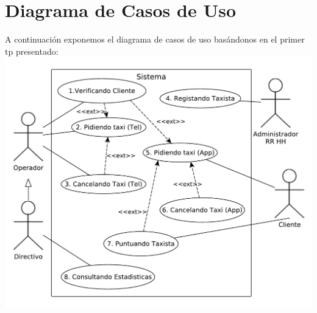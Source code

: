 \documentclass[a4paper]{article}
\begin{document}
\newtheorem{teo}{Teorema}[section]
\newtheorem{propo}{Proposici\'{o}n}[section]
\newtheorem{lema}{Lema}[section]
\newtheorem{coro}{Corolario}[section]
\newtheorem{defi}{Definici\'{o}n}[section]

\newpage
\thispagestyle{empty}
\tableofcontents

\parskip=5pt
\setlength{\parindent}{0pt}

\newpage
\setcounter{page}{1}
\pagestyle{plain}

\newpage


\newcommand{\Asig}{\ensuremath{\leftarrow}}
\newcommand{\AndY}{\ensuremath{\wedge}}
\newcommand{\Or}{\ensuremath{\vee}}
\newcommand{\Not}{\ensuremath{\neg}}
\newcommand{\NotEq}{\ensuremath{\neq}}
\newcommand{\MayorIg}{\ensuremath{\geq}}
\newcommand{\tabu}{\hspace*{0.7cm}}
\newcommand{\ctabu}{\hspace*{0.8cm}}
\newcommand{\htabu}{\hspace*{0.35cm}}
\newcommand{\moduloNombre}[1]{\textbf{#1}}



\section{Diagrama de Casos de Uso}

A continuaci\'on exponemos el diagrama de casos de uso bas\'andonos en el primer tp presentado:
\\
\includegraphics[scale=0.75]{diag_CasosDeUso.pdf}
\end{document}
